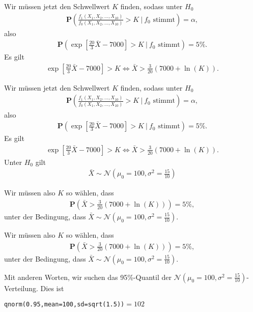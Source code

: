 \documentclass[t,11pt]{beamer}
\begin{document}
\begin{frame}
	Wir müssen jetzt den Schwellwert $K$ finden, sodass unter $H_0$
	\begin{align*}
		\mathbf{P}\left(\frac{f_1(X_1,X_2,\dots,X_{10})}{f_0(X_1,X_2,\dots,X_{10})}>K~\bigg\vert~ f_0\text{ stimmt}\right)=\alpha, 
	\end{align*}
	also
	\begin{align*}
	\mathbf{P}\left(\exp \left[ \frac{20}{3}\bar{X}-7000  \right]>K~\bigg\vert~ f_0\text{ stimmt}\right)=5\%.
	\end{align*}
	Es gilt
	\begin{align*}
		\exp \left[ \frac{20}{3}\bar{X}-7000  \right]>K \Leftrightarrow \bar{X}>\frac{3}{20}(7000+\ln(K)).
	\end{align*}
\end{frame}

\begin{frame}
Wir müssen jetzt den Schwellwert $K$ finden, sodass unter $H_0$
\begin{align*}
\mathbf{P}\left(\frac{f_1(X_1,X_2,\dots,X_{10})}{f_0(X_1,X_2,\dots,X_{10})}>K~\bigg\vert~ f_0\text{ stimmt}\right)=\alpha, 
\end{align*}
also
\begin{align*}
\mathbf{P}\left(\exp \left[ \frac{20}{3}\bar{X}-7000  \right]>K~\bigg\vert~ f_0\text{ stimmt}\right)=5\%.
\end{align*}
Es gilt
\begin{align*}
\exp \left[ \frac{20}{3}\bar{X}-7000  \right]>K \Leftrightarrow \bar{X}>\frac{3}{20}(7000+\ln(K)).
\end{align*}
Unter $H_0$ gilt
\begin{align*}
\bar{X}\sim \mathcal{N}\left(\mu_0=100,\sigma^2=\frac{15}{10}\right)
\end{align*}
\end{frame}

\begin{frame}
Wir müssen also $K$ so wählen, dass
\begin{align*}
\mathbf{P}\left(\bar{X}>\frac{3}{20}(7000+\ln(K))\right)=5\%, 
\end{align*}
unter der Bedingung, dass $\bar{X}\sim \mathcal{N}(\mu_0=100,\sigma^2=\frac{15}{10})$. 

\end{frame}

\begin{frame}
Wir müssen also $K$ so wählen, dass
\begin{align*}
\mathbf{P}\left(\bar{X}>\frac{3}{20}(7000+\ln(K))\right)=5\%, 
\end{align*}
unter der Bedingung, dass $\bar{X}\sim \mathcal{N}(\mu_0=100,\sigma^2=\frac{15}{10})$. 

\vspace{0.5cm}

Mit anderen Worten, wir suchen das 95\%-Quantil der $\mathcal{N}(\mu_0=100,\sigma^2=\frac{15}{10})$-Verteilung. Dies ist

\begin{center}
	\texttt{qnorm(0.95,mean=100,sd=sqrt(1.5))}$=102$
\end{center}

\end{frame}
\end{document}
